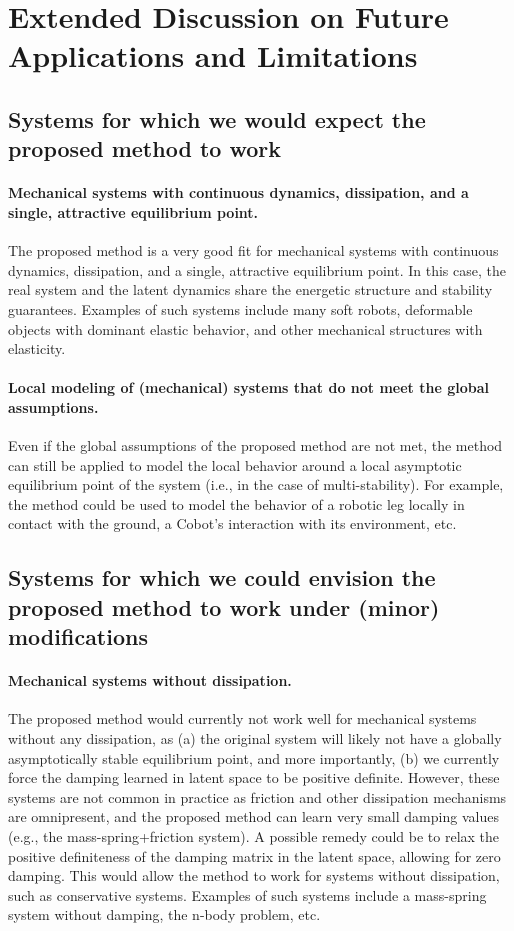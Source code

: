 \section{Extended Discussion on Future Applications and Limitations}\label{apx:sec:limitations}

\subsection{Systems for which we would expect the proposed method to work}
\paragraph{Mechanical systems with continuous dynamics, dissipation, and a single, attractive equilibrium point.}
The proposed method is a very good fit for mechanical systems with continuous dynamics, dissipation, and a single, attractive equilibrium point. In this case, the real system and the latent dynamics share the energetic structure and stability guarantees. Examples of such systems include many soft robots, deformable objects with dominant elastic behavior, and other mechanical structures with elasticity.

\paragraph{Local modeling of (mechanical) systems that do not meet the global assumptions.}
Even if the global assumptions of the proposed method are not met, the method can still be applied to model the local behavior around a local asymptotic equilibrium point of the system (i.e., in the case of multi-stability). For example, the method could be used to model the behavior of a robotic leg locally in contact with the ground, a \gls{Cobot}'s interaction with its environment, etc.

\subsection{Systems for which we could envision the proposed method to work under (minor) modifications}
\paragraph{Mechanical systems without dissipation.}
The proposed method would currently not work well for mechanical systems without any dissipation, as (a) the original system will likely not have a globally asymptotically stable equilibrium point, and more importantly, (b) we currently force the damping learned in latent space to be positive definite. However, these systems are not common in practice as friction and other dissipation mechanisms are omnipresent, and the proposed method can learn very small damping values (e.g., the mass-spring+friction system). A possible remedy could be to relax the positive definiteness of the damping matrix in the latent space, allowing for zero damping. This would allow the method to work for systems without dissipation, such as conservative systems. Examples of such systems include a mass-spring system without damping, the n-body problem, etc.

